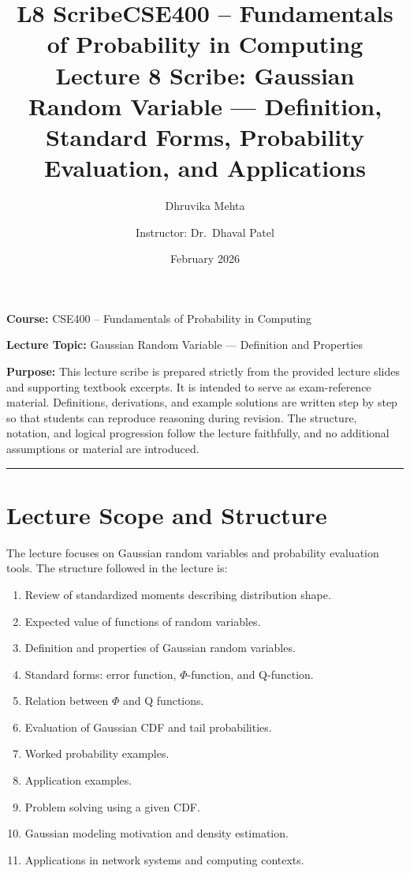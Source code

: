 \documentclass{article}
\title{L8 Scribe}
\author{Dhruvika Mehta}
\date{February 2026}
\begin{document}
\title{CSE400 -- Fundamentals of Probability in Computing\\
Lecture 8 Scribe: Gaussian Random Variable --- Definition, Standard Forms, Probability Evaluation, and Applications}
\author{Instructor: Dr.\ Dhaval Patel}
\date{}



\maketitle

\textbf{Course:} CSE400 -- Fundamentals of Probability in Computing

\textbf{Lecture Topic:} Gaussian Random Variable --- Definition and Properties

\textbf{Purpose:} This lecture scribe is prepared strictly from the provided lecture slides and supporting textbook excerpts. It is intended to serve as exam-reference material. Definitions, derivations, and example solutions are written step by step so that students can reproduce reasoning during revision. The structure, notation, and logical progression follow the lecture faithfully, and no additional assumptions or material are introduced.

\hrule
\vspace{0.5em}

\section{Lecture Scope and Structure}

The lecture focuses on Gaussian random variables and probability evaluation tools. The structure followed in the lecture is:

\begin{enumerate}
    \item Review of standardized moments describing distribution shape.
    \item Expected value of functions of random variables.
    \item Definition and properties of Gaussian random variables.
    \item Standard forms: error function, $\Phi$-function, and Q-function.
    \item Relation between $\Phi$ and Q functions.
    \item Evaluation of Gaussian CDF and tail probabilities.
    \item Worked probability examples.
    \item Application examples.
    \item Problem solving using a given CDF.
    \item Gaussian modeling motivation and density estimation.
    \item Applications in network systems and computing contexts.
\end{enumerate}
\end{document}
